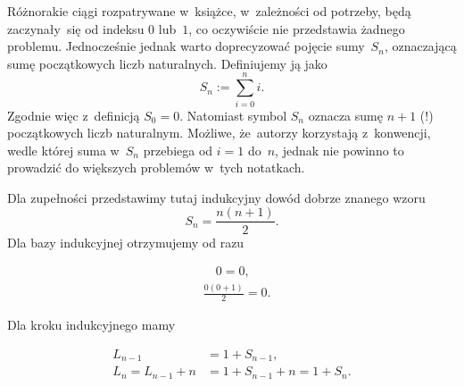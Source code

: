\documentclass[a4paper,11pt]{article}
\numberwithin{equation}{section}
\begin{document}
Różnorakie ciągi rozpatrywane w~książce, w~zależności od potrzeby, będą
zaczynały~się od indeksu $0$ lub~$1$, co oczywiście nie przedstawia żadnego
problemu. Jednocześnie jednak warto doprecyzować pojęcie sumy~$S_{ n }$,
oznaczającą sumę początkowych liczb naturalnych. Definiujemy ją jako
\begin{equation}
  \label{eq:1112}
  S_{ n } := \sum_{ i = 0 }^{ n } i.
\end{equation}
Zgodnie więc z~definicją $S_{ 0 } = 0$. Natomiast symbol $S_{ n }$ oznacza
sumę $n + 1$ (!) początkowych liczb naturalnym. Możliwe, że~autorzy
korzystają z~konwencji, wedle której suma w~$S_{ n }$ przebiega od $i = 1$
do~$n$, jednak nie powinno to prowadzić do większych problemów w~tych
notatkach.

\VerSpaceFour





\noindent
Dla zupełności przedstawimy tutaj indukcyjny dowód dobrze znanego wzoru
\begin{equation}
  \label{eq:1113}
  S_{ n } = \frac{ n ( n + 1 ) }{ 2 }.
\end{equation}
Dla bazy indukcyjnej otrzymujemy od razu

\negVerSpaceFour


\begin{subequations}

  \begin{align}
    \label{eq:aa}
    &\hspace{1em} 0 = 0, \\
    &\frac{ 0 ( 0 + 1 ) }{ 2 } = 0.
  \end{align}

\end{subequations}


\noindent
Dla kroku indukcyjnego mamy

\begin{subequations}

  \begin{align}
    \label{eq:aa}
    L_{ n - 1 } &= 1 + S_{ n - 1 }, \\
    L_{ n } = L_{ n - 1 } + n &= 1 + S_{ n - 1 } + n = 1 + S_{ n }.
  \end{align}

\end{subequations}








\end{document}
